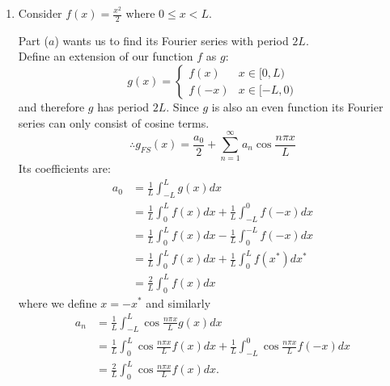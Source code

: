 \pagestyle{fancy}
\fancyhead{}

\begin{enumerate}
    \item Consider $f(x)=\frac{x^2}{2}$ where $0\leq x<L$.

    Part ($a$) wants us to find its Fourier series with period $2L$. \\

    Define an extension of our function $f$ as $g$:
    $$g(x) =
    \left\{
    \begin{array}{ll}
	   f(x)  & \mbox{} x\in[0,L) \\
	   f(-x) & \mbox{} x\in[-L,0)
    \end{array}
    \right.$$
    and therefore $g$ has period $2L$. Since $g$ is also an even function its Fourier series can only consist of cosine terms.
    $$\therefore g_{FS}(x)=\frac{a_0}{2}+\sum_{n=1}^{\infty}a_n\cos\frac{n\pi x}{L}$$
    Its coefficients are:
    \begin{align*}
        a_0
        &=\frac{1}{L}\int_{-L}^{L}g(x)dx \\
        &=\frac{1}{L}\int_{0}^{L}f(x)dx+\frac{1}{L}\int_{-L}^{0}f(-x)dx \\
        &=\frac{1}{L}\int_{0}^{L}f(x)dx-\frac{1}{L}\int_{0}^{-L}f(-x)dx \\
        &=\frac{1}{L}\int_{0}^{L}f(x)dx+\frac{1}{L}\int_{0}^{L}f(x^*)dx^* \\
        &=\frac{2}{L}\int_{0}^{L}f(x)dx
    \end{align*}
    where we define $x=-x^*$ and similarly
    \begin{align*}
        a_n
        &=\frac{1}{L}\int_{-L}^{L}\cos\frac{n\pi x}{L}g(x)dx \\
        &=\frac{1}{L}\int_{0}^{L}\cos\frac{n\pi x}{L}f(x)dx+\frac{1}{L}\int_{-L}^{0}\cos\frac{n\pi x}{L}f(-x)dx \\
        &=\frac{2}{L}\int_{0}^{L}\cos\frac{n\pi x}{L}f(x)dx.
    \end{align*}

    \newpage


\end{enumerate}
